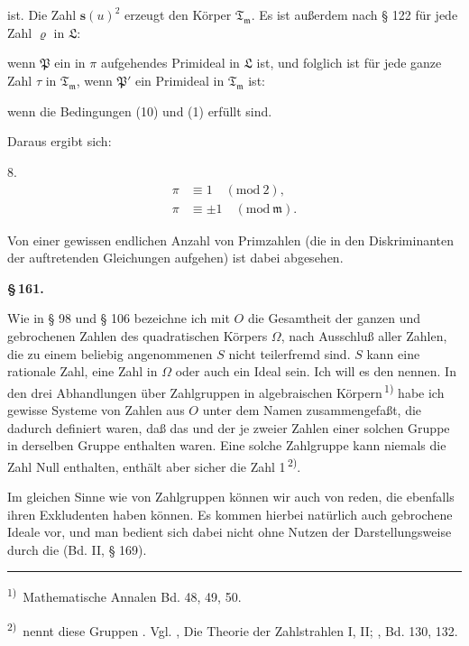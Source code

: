ist. Die Zahl $\boldsymbol{s}(u)^2$ erzeugt den Körper $\mathfrak{T}_{\mathfrak{m}}$. Es ist außerdem
nach § 122 für jede Zahl $\varrho$ in $\mathfrak{L}$:


wenn $\mathfrak{P}$ ein in $\pi$ aufgehendes Primideal in $\mathfrak{L}$ ist, und folglich ist
für jede ganze Zahl $\tau$ in $\mathfrak{T}_{\mathfrak{m}}$, wenn $\mathfrak{P}'$ ein Primideal in $\mathfrak{T}_{\mathfrak{m}}$ ist:


wenn die Bedingungen (10) und (1) erfüllt sind.

Daraus ergibt sich:

8. 
\[
\begin{aligned}
\pi &\equiv 1 \quad (\mathrm{mod}\ 2), \\
\pi &\equiv \pm 1 \quad (\mathrm{mod}\ \mathfrak{m}).
\end{aligned}
\]

Von einer gewissen endlichen Anzahl von Primzahlen (die in
den Diskriminanten der auftretenden Gleichungen aufgehen) ist
dabei abgesehen.

\begin{center}
\textbf{\S\,161.\qquad {}}
\end{center}

Wie in § 98 und § 106 bezeichne ich mit $O$ die Gesamtheit
der ganzen und gebrochenen Zahlen des quadratischen Körpers $\Omega$,
nach Ausschluß aller Zahlen, die zu einem beliebig angenommenen
$S$ nicht teilerfremd sind. $S$ kann eine rationale Zahl, eine Zahl
in $\Omega$ oder auch ein Ideal sein. Ich will es den 
nennen. In den drei Abhandlungen \glqq über Zahlgruppen in algebraischen
 Körpern\grqq{}\,\textsuperscript{1)} habe ich gewisse Systeme von Zahlen aus $O$
unter dem Namen  zusammengefaßt, die dadurch
definiert waren, daß das  und der  je zweier
Zahlen einer solchen Gruppe in derselben Gruppe enthalten waren.
Eine solche Zahlgruppe kann niemals die Zahl Null enthalten,
enthält aber sicher die Zahl 1\,\textsuperscript{2)}.

Im gleichen Sinne wie von Zahlgruppen können wir auch von
 reden, die ebenfalls ihren Exkludenten haben
können. Es kommen hierbei natürlich auch gebrochene Ideale
vor, und man bedient sich dabei nicht ohne Nutzen der Darstellungsweise
 durch die  (Bd. II, § 169).

\begingroup
\footnotesize
\noindent\rule{4cm}{0.4pt}\par
\textsuperscript{1)}\, Mathematische Annalen Bd. 48, 49, 50.

\textsuperscript{2)}\,  nennt diese Gruppen \glqq {}\grqq{}. Vgl. , Die
Theorie der Zahlstrahlen I, II; , Bd. 130, 132.
\endgroup
